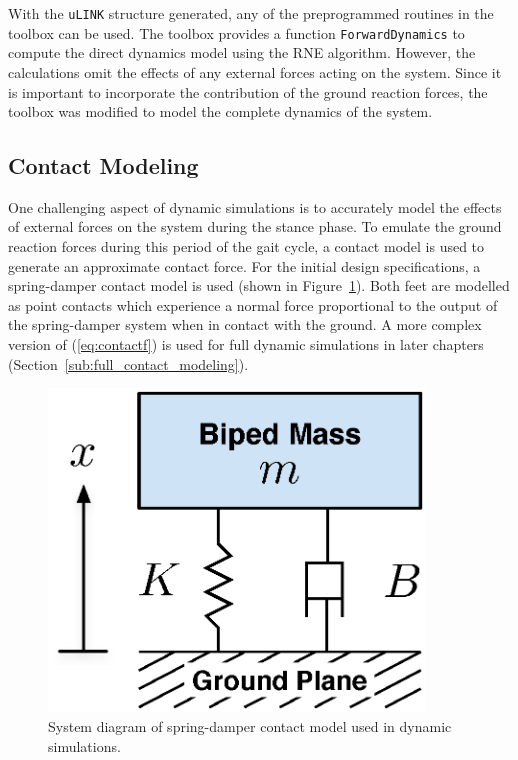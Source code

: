 With the \texttt{uLINK} structure generated, any of the preprogrammed routines in the toolbox can be used. The toolbox provides a function \texttt{ForwardDynamics} to compute the direct dynamics model using the RNE algorithm. However, the calculations omit the effects of any external forces acting on the system. Since it is important to incorporate the contribution of the ground reaction forces, the toolbox was modified to model the complete dynamics of the system. 

\subsection{Contact Modeling} %
\label{sub:initial_contact_modeling}

One challenging aspect of dynamic simulations is to accurately model the effects of external forces on the system during the stance phase. To emulate the ground reaction forces during this period of the gait cycle, a contact model is used to generate an approximate contact force. For the initial design specifications, a spring-damper contact model is used (shown in Figure~\ref{fig:springdamper}). Both feet are modelled as point contacts which experience a normal force proportional to the output of the spring-damper system when in contact with the ground. A more complex version of (\ref{eq:contactf}) is used for full dynamic simulations in later chapters (Section~\ref{sub:full_contact_modeling}).

\begin{figure}[!h]
	\begin{center}
    \includegraphics[width=100mm]{fig/design/springdamper.eps}
	\end{center}
  \caption{System diagram of spring-damper contact model used in dynamic simulations.}
  \label{fig:springdamper}
\end{figure}


